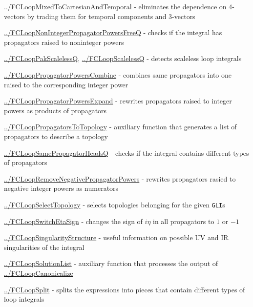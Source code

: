 \documentclass[../FeynCalcManual.tex]{subfiles}
\begin{document}
\begin{itemize}
{  \hyperlink{../fcloopmixedtocartesianandtemporal}{../FCLoopMixedToCartesianAndTemporal}
  - eliminates the dependence on \(4\)-vectors by trading them for
  temporal components and \(3\)-vectors
\item
  \hyperlink{../fcloopnonintegerpropagatorpowersfreeq}{../FCLoopNonIntegerPropagatorPowersFreeQ}
  - checks if the integral has propagators raised to noninteger powers
\item
  \hyperlink{../fclooppakscalelessq}{../FCLoopPakScalelessQ},
  \hyperlink{../fcloopscalelessq}{../FCLoopScalelessQ} - detects
  scaleless loop integrals
\item
  \hyperlink{../fclooppropagatorpowerscombine}{../FCLoopPropagatorPowersCombine}
  - combines same propagators into one raised to the corresponding
  integer power
\item
  \hyperlink{../fclooppropagatorpowersexpand}{../FCLoopPropagatorPowersExpand}
  - rewrites propagators raised to integer powers as products of
  propagators
\item
  \hyperlink{../fclooppropagatorstotopology}{../FCLoopPropagatorsToTopology}
  - auxiliary function that generates a list of propagators to describe
  a topology
\item
  \hyperlink{../fcloopsamepropagatorheadsq}{../FCLoopSamePropagatorHeadsQ}
  - checks if the integral contains different types of propagators
\item
  \hyperlink{../fcloopremovenegativepropagatorpowers}{../FCLoopRemoveNegativePropagatorPowers}
  - rewrites propagators rasied to negative integer powers as numerators
\item
  \hyperlink{../fcloopselecttopology}{../FCLoopSelectTopology} - selects
  topologies belonging for the given \texttt{GLI}s
\item
  \hyperlink{../fcloopswitchetasign}{../FCLoopSwitchEtaSign} - changes
  the sign of \(i \eta\) in all propagators to \(1\) or \(-1\)
\item
  \hyperlink{../fcloopsingularitystructure}{../FCLoopSingularityStructure}
  - useful information on possible UV and IR singularities of the
  integral
\item
  \hyperlink{../fcloopsolutionlist}{../FCLoopSolutionList} - auxiliary
  function that processes the output of
  \hyperlink{../fcloopcanonicalize}{../FCLoopCanonicalize}
\item
  \hyperlink{../fcloopsplit}{../FCLoopSplit} - splits the expressions
  into pieces that contain different types of loop integrals
\item
}
\end{itemize}
\end{document}
